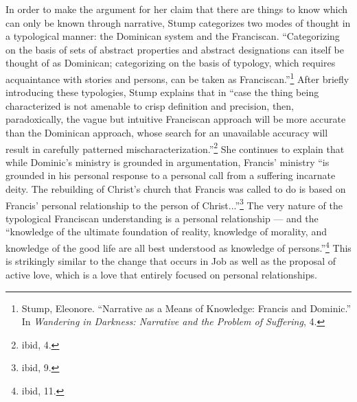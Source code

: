In order to make the argument for her claim that there are things to know which can only be known through narrative, Stump categorizes two modes of thought in a typological manner: the Dominican system and the Franciscan. ``Categorizing on the basis of sets of abstract properties and abstract designations can itself be thought of as Dominican; categorizing on the basis of typology, which requires acquaintance with stories and persons, can be taken as Franciscan.''\footnote{Stump, Eleonore. ``Narrative as a Means of Knowledge: Francis and Dominic.'' In \emph{\emph{Wandering in Darkness: Narrative and the Problem of Suffering}}, 4.} After briefly introducing these typologies, Stump explains that in ``case the thing being characterized is not amenable to crisp definition and precision, then, paradoxically, the vague but intuitive Franciscan approach will be more accurate than the Dominican approach, whose search for an unavailable accuracy will result in carefully patterned mischaracterization.''\footnote{ibid, 4.} 
She continues to explain that while Dominic's ministry is grounded in argumentation, Francis' ministry ``is grounded in his personal response to a personal call from a suffering incarnate deity. The rebuilding of Christ's church that Francis was called to do is based on Francis' personal relationship to the person of Christ...''\footnote{ibid, 9.} The very nature of the typological Franciscan understanding is a personal relationship --- and the ``knowledge of the ultimate foundation of reality, knowledge of morality, and knowledge of the good life are all best understood as knowledge of persons.''\footnote{ibid, 11.} This is strikingly similar to the change that occurs in Job as well as the proposal of active love, which is a love that entirely focused on personal relationships.

